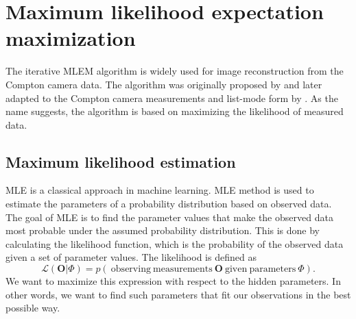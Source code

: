 
\section{Maximum likelihood expectation maximization}
The iterative \ac{MLEM} algorithm is widely used for image reconstruction from the Compton camera data. %
The algorithm was originally proposed by \cite{MLEM_Shepp_1982} and later adapted to the Compton camera measurements and list-mode form by \cite{wilderman}.
As the name suggests, the algorithm is based on maximizing the likelihood of measured data.

\subsection{Maximum likelihood estimation}
\ac{MLE} is a classical approach in machine learning.
\ac{MLE} method is used to estimate the parameters of a probability distribution based on observed data. 
The goal of \ac{MLE} is to find the parameter values that make the observed data most probable under the assumed probability distribution.
This is done by calculating the likelihood function, which is the probability of the observed data given a set of parameter values.
The likelihood is defined as 
\begin{equation}
  \mathcal{L}(\boldsymbol{O}| \Phi) = p(\ \mathrm{observing\ measurements} \  \boldsymbol{O} \ \mathrm{given\ parameters\ } \Phi ).
  \label{eq:likelihood}
\end{equation}
We want to maximize this expression with respect to the hidden parameters.
In other words, we want to find such parameters that fit our observations in the best possible way.

